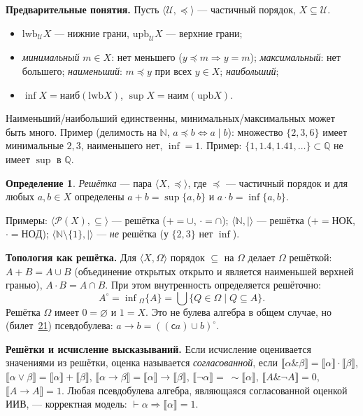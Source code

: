 \documentclass[11pt,a4paper]{article}
\newcommand{\amp}{\mathbin{\&}}
\newcommand{\vd}{\vdash}
\newcommand{\sem}[1]{\llbracket #1\rrbracket}
\newcommand{\cmpl}{\mathsf{c}}
\theoremstyle{definition}
\newtheorem*{dfn}{Определение}
\begin{document}
\textbf{Предварительные понятия.} Пусть $\langle\mathcal{U},\preceq\rangle$ --- частичный порядок, $X\subseteq\mathcal{U}$.
\begin{itemize}
\item $\mathrm{lwb}_{\mathcal U}X$ --- нижние грани, $\mathrm{upb}_{\mathcal U}X$ --- верхние грани;
\item \emph{минимальный} $m\in X$: нет меньшего ($y\preceq m\Rightarrow y=m$); \emph{максимальный}: нет большего; \emph{наименьший}: $m\preceq y$ при всех $y\in X$; \emph{наибольший};
\item $\inf X=\mathrm{наиб}(\mathrm{lwb}X)$, $\sup X=\mathrm{наим}(\mathrm{upb}X)$.
\end{itemize}
Наименьший/наибольший единственны, минимальных/максимальных может быть много. Пример (делимость на $\mathbb{N}$, $a\preceq b\iff a\mid b$): множество $\{2,3,6\}$ имеет минимальные $2,3$, наименьшего нет, $\inf=1$. Пример: $\{1,1.4,1.41,\dots\}\subset\mathbb{Q}$ не имеет $\sup$ в $\mathbb{Q}$.

\begin{dfn}
\emph{Решётка} --- пара $\langle X,\preceq\rangle$, где $\preceq$ --- частичный порядок и для любых $a,b\in X$ определены $a+b=\sup\{a,b\}$ и $a\cdot b=\inf\{a,b\}$.
\end{dfn}
Примеры: $\langle\mathcal{P}(X),\subseteq\rangle$ --- решётка ($+=\cup$, $\cdot=\cap$); $\langle\mathbb{N},\mid\rangle$ --- решётка ($+=\mathrm{НОК}$, $\cdot=\mathrm{НОД}$); $\langle\mathbb{N}\setminus\{1\},\mid\rangle$ --- \emph{не} решётка (у $\{2,3\}$ нет $\inf$).

\textbf{Топология как решётка.} Для $\langle X,\Omega\rangle$ порядок $\subseteq$ на $\Omega$ делает $\Omega$ решёткой: $A+B=A\cup B$ (объединение открытых открыто и является наименьшей верхней гранью), $A\cdot B=A\cap B$. При этом внутренность определяется решёточно:
\[
A^\circ=\inf{}_\Omega\{A\}=\bigcup\{Q\in\Omega\mid Q\subseteq A\}.
\]
Решётка $\Omega$ имеет $0=\varnothing$ и $1=X$. Это не булева алгебра в общем случае, но (билет~\hyperref[T:21]{21}) псевдобулева: $a\to b=((\cmpl a)\cup b)^\circ$.

\textbf{Решётки и исчисление высказываний.} Если исчисление оценивается значениями из решётки, оценка называется \emph{согласованной}, если $\sem{\alpha\amp\beta}=\sem{\alpha}\cdot\sem{\beta}$, $\sem{\alpha\vee\beta}=\sem{\alpha}+\sem{\beta}$, $\sem{\alpha\to\beta}=\sem{\alpha}\to\sem{\beta}$, $\sem{\neg\alpha}=\ \sim\sem{\alpha}$, $\sem{A\amp\neg A}=0$, $\sem{A\to A}=1$. Любая псевдобулева алгебра, являющаяся согласованной оценкой ИИВ, --- корректная модель: $\vd\alpha\Rightarrow\sem{\alpha}=1$.
\end{document}
